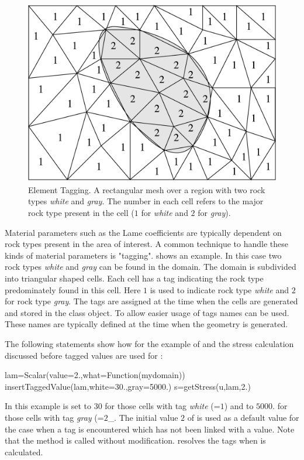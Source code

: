 \begin{figure}
\includegraphics[width=\textwidth]{figures/EscriptDiagram2.eps}
\caption{\label{Figure: tag}Element Tagging. A rectangular mesh over a region with two rock types {\it white} and {\it gray}.
The number in each cell refers to the major rock type present in the cell ($1$ for {\it white} and $2$ for {\it gray}).
}
\end{figure}

Material parameters such as the Lame coefficients are typically dependent on rock types present in the 
area of interest. A common technique to handle these kinds of material parameters is "tagging". 
shows an example. In this case two rock types {\it white} and {\it gray} can be found in the domain. The domain
is subdivided into triangular shaped cells. Each 
cell has a tag indicating the rock type predominately found in this cell. Here $1$ is used to indicate
rock type {\it white} and $2$ for rock type {\it gray}. The tags are assigned at the time when the cells are generated
and stored in the \Domain class object. To allow easier usage of tags names can be used. These names are typically defined 
at the time when the geometry is generated. 

The following statements show how for the
example of  and the stress calculation discussed before tagged values are used for
:
\begin{python}
lam=Scalar(value=2.,what=Function(mydomain))
insertTaggedValue(lam,white=30.,gray=5000.)
s=getStress(u,lam,2.)
\end{python}
In this example  is set to $30$ for those cells with tag {\it white} (=$1$) and to $5000.$ for those cells 
with tag {\it gray} (=$2$_. The initial value $2$ of  is used as a default value for the case when a tag
is encountered which has not been linked with a value. Note that the  method
is called without modification. \escript resolves the tags when  is calculated.

